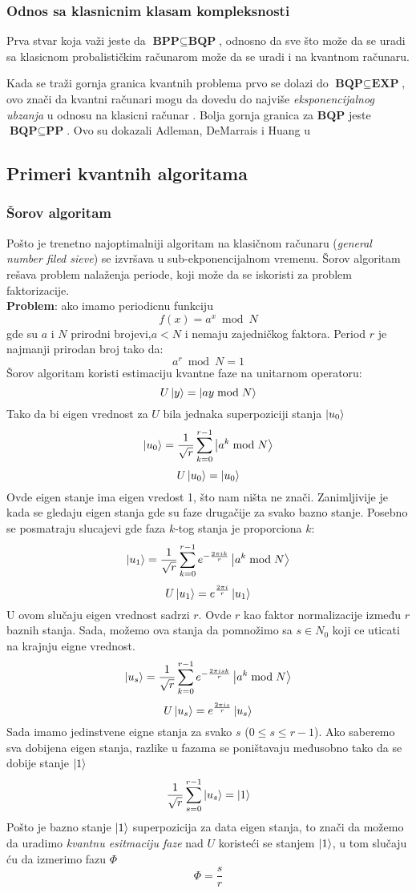 \documentclass[12pt, letterpaper, oneside]{article}
\begin{document}
\subsubsection*{Odnos sa klasnicnim klasam kompleksnosti}
Prva stvar koja važi jeste da $\textbf{BPP} \subseteq \textbf{BQP}$, odnosno da sve što može da se uradi sa klasicnom probalističkim računarom može da 
se uradi i na kvantnom računaru.

Kada se traži gornja granica kvantnih problema prvo se dolazi do $\textbf{BQP} \subseteq \textbf{EXP}$, ovo znači da kvantni računari mogu da dovedu
do najviše \textit{eksponencijalnog ubzanja} u odnosu na klasicni računar \cite{aaronson2013quantum}.
Bolja gornja granica za $\textbf{BQP}$ jeste $\textbf{BQP} \subseteq \textbf{PP}$. Ovo su dokazali Adleman, DeMarrais i Huang u \cite{adleman1997quantum}
\subsection{Primeri kvantnih algoritama}
\subsubsection{Šorov algoritam}
Pošto je trenetno najoptimalniji algoritam na klasičnom računaru (\textit{general number filed sieve}) se izvršava u sub-ekponencijalnom vremenu.
Šorov algoritam rešava problem nalaženja periode, koji može da se iskoristi za problem faktorizacije. \cite{QiskiShoreAlgo} \\
\textbf{Problem}: ako imamo periodicnu funkciju
\[
    f(x) = a^x \bmod N
\]
gde su $a$ i $N$ prirodni brojevi,$a < N$ i nemaju zajedničkog faktora. Period $r$ je najmanji prirodan broj tako da:
\[
    a^r \bmod N = 1
\]
Šorov algoritam koristi estimaciju kvantne faze na unitarnom operatoru:
\[
    U\Ket{y} = \Ket{ay \bmod N}
\]
Tako da bi eigen vrednost za $U$ bila jednaka superpoziciji stanja $\Ket{u_0}$
\[
    \Ket{u_0}=\frac{1}{\sqrt{r}}\sum_{k=0}^{r-1}\Ket{a^k \bmod N}
\]
\[
    U\Ket{u_0} = \Ket{u_0}
\]
Ovde eigen stanje ima eigen vredost 1, što nam ništa ne znači. Zanimljivije je kada se gledaju eigen stanja
gde su faze drugačije za svako bazno stanje. Posebno se posmatraju slucajevi gde faza $k$-tog stanja je proporciona $k$:
\[
    \Ket{u_1}=\frac{1}{\sqrt{r}}\sum_{k=0}^{r-1}e^{-\frac{2\pi i k}{r}}\Ket{a^k \bmod N}
\]
\[
    U\Ket{u_1} = e^\frac{2\pi i}{r}\Ket{u_1}
\]
U ovom slučaju eigen vrednost sadrzi $r$. Ovde $r$ kao faktor normalizacije između $r$ baznih stanja.
Sada, možemo ova stanja da pomnožimo sa $s \in N_0$ koji ce uticati na krajnju eigne vrednost.
\[
    \Ket{u_s}=\frac{1}{\sqrt{r}}\sum_{k=0}^{r-1}e^{-\frac{2\pi isk}{r}}\Ket{a^k \bmod N}
\]
\[
    U\Ket{u_s} = e^\frac{2\pi is}{r}\Ket{u_s}
\]
Sada imamo jedinstvene eigne stanja za svako $s$ ($0 \leq s \leq r-1$). Ako saberemo sva dobijena eigen stanja, 
razlike u fazama se poništavaju međusobno tako da se dobije stanje $\Ket{1}$
\[
    \frac{1}{\sqrt{r}}\sum_{s=0}^{r-1}\Ket{u_s} = \Ket{1}
\]
Pošto je bazno stanje $\Ket{1}$ superpozicija za data eigen stanja, to znači da možemo da uradimo \textit{kvantnu esitmaciju faze} nad $U$
koristeći se stanjem $\Ket{1}$, u tom slučaju ću da izmerimo fazu $\Phi$
\[
    \Phi = \frac{s}{r}
\]
\end{document}
